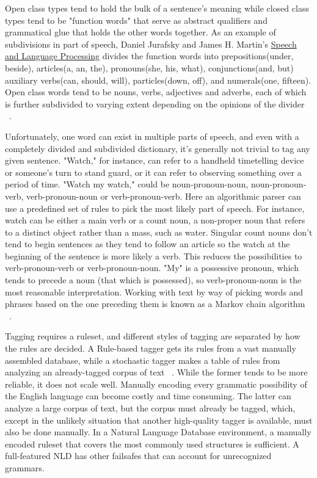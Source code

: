 \documentclass[12pt]{article}
\begin{document}
Open class types tend to hold the bulk of a sentence's meaning while closed class types tend to be "function words" that serve as abstract qualifiers and grammatical glue that holds the other words together. As an example of subdivisions in part of speech, Daniel Jurafsky and James H. Martin's \underline{Speech and Language Processing} divides the function words into prepositions(under, beside), articles(a, an, the), pronouns(she, his, what), conjunctions(and, but) auxiliary verbs(can, should, will), particles(down, off), and numerals(one, fifteen). Open class words tend to be nouns, verbs, adjectives and adverbs, each of which is further subdivided to varying extent depending on the opinions of the divider ~\citep{Jurafsky}.

Unfortunately, one word can exist in multiple parts of speech, and even with a completely divided and subdivided dictionary, it's generally not trivial to tag any given sentence. "Watch," for instance, can refer to a handheld timetelling device or someone's turn to stand guard, or it can refer to observing something over a period of time. "Watch my watch," could be noun-pronoun-noun, noun-pronoun-verb, verb-pronoun-noun or verb-pronoun-verb. Here an algorithmic parser can use a predefined set of rules to pick the most likely part of speech. For instance, watch can be either a main verb or a count noun, a non-proper noun that refers to a distinct object rather than a mass, such as water. Singular count nouns don't tend to begin sentences as they tend to follow an article so the watch at the beginning of the sentence is more likely a verb. This reduces the possibilities to verb-pronoun-verb or verb-pronoun-noun. "My" is a possessive pronoun, which tends to precede a noun (that which is possessed), so verb-pronoun-noun is the most reasonable interpretation.  Working with text by way of picking words and phrases based on the one preceding them is known as a Markov chain algorithm ~\citep{Markov}.

Tagging requires a ruleset, and different styles of tagging are separated by how the rules are decided. A Rule-based tagger gets its rules from a vast manually assembled database, while a stochastic tagger makes a table of rules from analyzing an already-tagged corpus of text ~\citep{Jurafsky}. While the former tends to be more reliable, it does not scale well. Manually encoding every grammatic possibility of the English language can become costly and time consuming. The latter can analyze a large corpus of text, but the corpus must already be tagged, which, except in the unlikely situation that another high-quality tagger is available, must also be done manually. In a Natural Language Database environment, a manually encoded ruleset that covers the most commonly used structures is sufficient. A full-featured NLD has other failsafes that can account for unrecognized grammars. 
\end{document}
